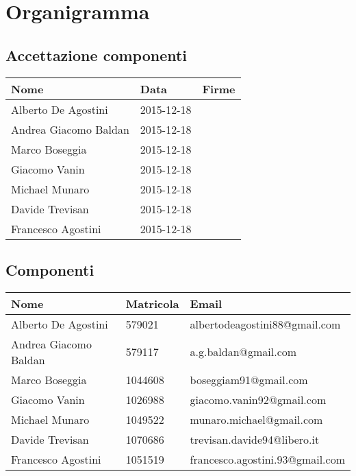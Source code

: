 \documentclass{scalatekids-article}
\begin{document}
\section{Organigramma}
\subsection{Accettazione componenti}
\begin{center}
  \begin{tabular}{|l | l | p{4cm} |}
    \hline
    Nome & Data & Firme \\
    \hline
    Alberto De Agostini & 2015-12-18 &\\
    Andrea Giacomo Baldan & 2015-12-18 &\\
    Marco Boseggia & 2015-12-18 &\\
    Giacomo Vanin & 2015-12-18 &\\
    Michael Munaro & 2015-12-18 &\\
    Davide Trevisan & 2015-12-18 &\\
    Francesco Agostini & 2015-12-18 &\\
    \hline
  \end{tabular}
\end{center}
\subsection{Componenti}
\begin{center}
  \begin{tabular}{|l | l | l |}
    \hline
    Nome & Matricola & Email \\
    \hline
    Alberto De Agostini & 579021 & albertodeagostini88@gmail.com\\
    Andrea Giacomo Baldan & 579117 & a.g.baldan@gmail.com\\
    Marco Boseggia & 1044608 & boseggiam91@gmail.com\\
    Giacomo Vanin & 1026988 & giacomo.vanin92@gmail.com\\
    Michael Munaro & 1049522 & munaro.michael@gmail.com\\
    Davide Trevisan & 1070686 & trevisan.davide94@libero.it\\
    Francesco Agostini & 1051519 & francesco.agostini.93@gmail.com\\
    \hline
  \end{tabular}
\end{center}
\end{document}
